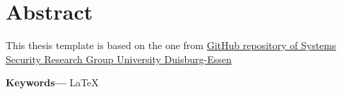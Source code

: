 \newpage
\chapter*{Abstract}
%

This thesis template is based on the one from \href{https://github.com/uni-due-syssec/thesis-template}{GitHub repository of Systems Security Research Group University Duisburg-Essen}

\providecommand{\keywords}[1]
{
	\normalsize	
	\textbf{{Keywords---}} #1
}

\vspace{10pt}
\keywords{\LaTeX}